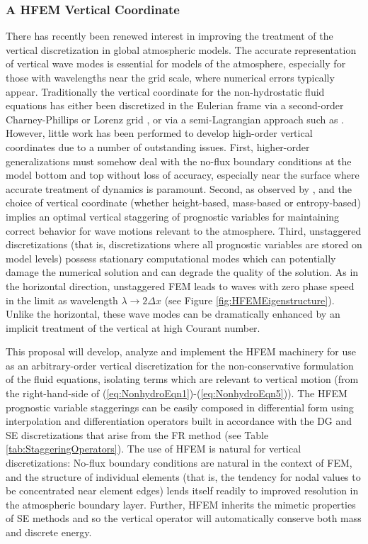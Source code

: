 \documentclass[11pt]{article}
\begin{document}
\subsubsection{A HFEM Vertical Coordinate} \label{sec:VerticalHFEM}

There has recently been renewed interest in improving the treatment of the vertical discretization in global atmospheric models.  The accurate representation of vertical wave modes is essential for models of the atmosphere, especially for those with wavelengths near the grid scale, where numerical errors typically appear.  Traditionally the vertical coordinate for the non-hydrostatic fluid equations has either been discretized in the Eulerian frame via a second-order Charney-Phillips \citep{JGCNAP1953JAS} or Lorenz grid \citep{AASM1988JAS}, or via a semi-Lagrangian approach such as \cite{SJL2004MWR}.  However, little work has been performed to develop high-order vertical coordinates due to a number of outstanding issues.  First, higher-order generalizations must somehow deal with the no-flux boundary conditions at the model bottom and top without loss of accuracy, especially near the surface where accurate treatment of dynamics is paramount.  Second, as observed by \cite{JTTJW2005JCP}, \cite{JT2006QJRMS} and \cite{MDTRDA2007JCP} the choice of vertical coordinate (whether height-based, mass-based or entropy-based) implies an optimal vertical staggering of prognostic variables for maintaining correct behavior for wave motions relevant to the atmosphere.  Third, unstaggered discretizations (that is, discretizations where all prognostic variables are stored on model levels) possess stationary computational modes which can potentially damage the numerical solution and can degrade the quality of the solution.  As in the horizontal direction, unstaggered FEM leads to waves with zero phase speed in the limit as wavelength $\lambda \to 2 \Delta x$ (see Figure \ref{fig:HFEMEigenstructure}).  Unlike the horizontal, these wave modes can be dramatically enhanced by an implicit treatment of the vertical at high Courant number.

This proposal will develop, analyze and implement the HFEM machinery for use as an arbitrary-order vertical discretization for the non-conservative formulation of the fluid equations, isolating terms which are relevant to vertical motion (from the right-hand-side of (\ref{eq:NonhydroEqn1})-(\ref{eq:NonhydroEqn5})).  The HFEM prognostic variable staggerings can be easily composed in differential form using interpolation and differentiation operators built in accordance with the DG and SE discretizations that arise from the FR method (see Table \ref{tab:StaggeringOperators}).  The use of HFEM is natural for vertical discretizations:  No-flux boundary conditions are natural in the context of FEM, and the structure of individual elements (that is, the tendency for nodal values to be concentrated near element edges) lends itself readily to improved resolution in the atmospheric boundary layer.  Further, HFEM inherits the mimetic properties of SE methods and so the vertical operator will automatically conserve both mass and discrete energy.
\end{document}
